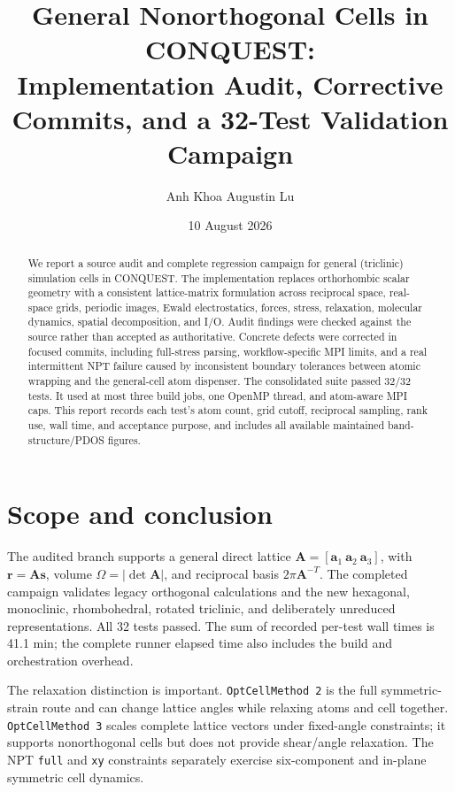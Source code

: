 \documentclass[aps,prb,preprint,superscriptaddress,longbibliography,floatfix]{revtex4-2}
\newcommand{\CQ}{CONQUEST}
\newcommand{\code}[1]{\texttt{#1}}
\begin{document}
\title{General Nonorthogonal Cells in \CQ:\\Implementation Audit, Corrective Commits, and a 32-Test Validation Campaign}
\author{Anh Khoa Augustin Lu}
\date{10 August 2026}
\begin{abstract}
We report a source audit and complete regression campaign for general (triclinic) simulation cells in \CQ. The implementation replaces orthorhombic scalar geometry with a consistent lattice-matrix formulation across reciprocal space, real-space grids, periodic images, Ewald electrostatics, forces, stress, relaxation, molecular dynamics, spatial decomposition, and I/O. Audit findings were checked against the source rather than accepted as authoritative. Concrete defects were corrected in focused commits, including full-stress parsing, workflow-specific MPI limits, and a real intermittent NPT failure caused by inconsistent boundary tolerances between atomic wrapping and the general-cell atom dispenser. The consolidated suite passed 32/32 tests. It used at most three build jobs, one OpenMP thread, and atom-aware MPI caps. This report records each test's atom count, grid cutoff, reciprocal sampling, rank use, wall time, and acceptance purpose, and includes all available maintained band-structure/PDOS figures.
\end{abstract}
\maketitle

\section{Scope and conclusion}
The audited branch supports a general direct lattice $\mathbf A=[\mathbf a_1\ \mathbf a_2\ \mathbf a_3]$, with $\mathbf r=\mathbf A\mathbf s$, volume $\Omega=|\det\mathbf A|$, and reciprocal basis $2\pi\mathbf A^{-T}$. The completed campaign validates legacy orthogonal calculations and the new hexagonal, monoclinic, rhombohedral, rotated triclinic, and deliberately unreduced representations. All 32 tests passed. The sum of recorded per-test wall times is 41.1 min; the complete runner elapsed time also includes the build and orchestration overhead.

The relaxation distinction is important. \code{OptCellMethod 2} is the full symmetric-strain route and can change lattice angles while relaxing atoms and cell together. \code{OptCellMethod 3} scales complete lattice vectors under fixed-angle constraints; it supports nonorthogonal cells but does not provide shear/angle relaxation. The NPT \code{full} and \code{xy} constraints separately exercise six-component and in-plane symmetric cell dynamics.
\end{document}
